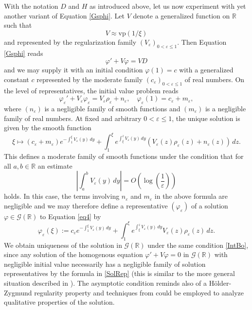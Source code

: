 \documentclass[sumlimits,intlimits,namelimits%
]{amsart}
\newcommand{\G}{\ensuremath{\mathcal{G}}}
\newcommand{\mb}[1]{\ensuremath{\mathbb{#1}}}
\newcommand{\R}{\mb{R}}
\newcommand{\vp}{\mathrm{vp}}
\theoremstyle{definition}
\newcommand{\beq}{\begin{equation}}
\newcommand{\eeq}{\end{equation}}
\newcommand{\eps}{\varepsilon}
\newcommand{\vphi}{\varphi}
\begin{document}
With the notation $D$ and $H$ as introduced above, let us now experiment with yet another variant of Equation \eqref{Gsphi}. Let $V$ denote a generalized function on $\R$ such that
$$
    V \approx \vp(1/\xi)
$$
and represented by the regularization family $(V_\eps)_{0 < \eps \leq 1}$. Then Equation \eqref{Gsphi} reads
\beq\label{eq4}
     \vphi' + V \vphi = V D
\eeq
and we may supply it with an initial condition $\vphi(1) = c$ with a generalized constant $c$ represented by the moderate family $(c_\eps)_{0 < \eps \leq 1}$ of real numbers. On the level of representatives, the initial value problem reads
$$
   \vphi_\eps' + V_\eps \vphi_\eps = V_\eps \rho_\eps + n_\eps, \quad \vphi_\eps(1) = c_\eps + m_\eps,
$$
where $(n_\eps)$ is a negligible family of smooth functions and $(m_\eps)$ is a negligible family of real numbers. At fixed and arbitrary $0 < \eps \leq 1$, the unique solution is given by the smooth function
\beq\label{SolRep}
   \xi \mapsto  (c_\eps + m_\eps) e^{- \int_1^\xi V_\eps(y) \, dy} + 
     \int_1^\xi e^{\int_\xi^z V_\eps(y) \,dy} (V_\eps(z) \rho_\eps(z) + n_\eps(z))\, dz.
\eeq
This defines a moderate family of smooth functions under the condition that for all $a, b \in \R$ an estimate
\beq\label{IntBo}
   \left| \int_a^b V_\eps(y) \, dy \right| = O\left(\log\left(\frac{1}{\eps}\right)\right)
\eeq
holds. In this case, the terms involving $n_\eps$ and $m_\eps$ in the above formula are negligible and we may therefore define a representative $(\vphi_\eps)$ of a solution $\vphi \in \G(\R)$ to Equation \eqref{eq4} by
\beq\label{phiRep}
   \vphi_\eps(\xi) :=  c_\eps e^{- \int_1^\xi V_\eps(y) \, dy} +  \int_1^\xi e^{\int_\xi^z V_\eps(y) \,dy} V_\eps(z) \rho_\eps(z)\, dz.
\eeq
We obtain uniqueness of the solution in $\G(\R)$ under the same condition \eqref{IntBo}, since any solution of the homogenous equation $\vphi' + V \vphi = 0$ in $\G(\R)$ with negligible initial value necessarily has a negligible family of solution representatives by the formula in \eqref{SolRep} (this is similar to the more general situation described in \cite[Theorem 1.5.2]{GKOS:01}). The asymptotic condition reminds also of a H\"older-Zygmund regularity property and techniques from \cites{Hoermann:04} could be employed to analyze qualitative properties of the solution.
\end{document}
